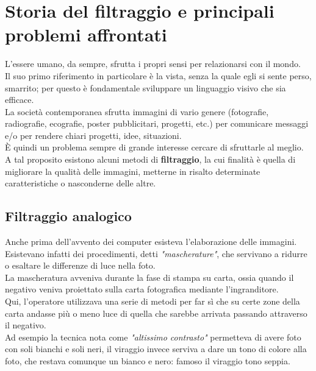 \section{Storia del filtraggio e principali problemi affrontati}

L'essere umano, da sempre, sfrutta i propri sensi per relazionarsi con il mondo.\\
Il suo primo riferimento in particolare è la vista, senza la quale egli si sente perso, smarrito; per questo è fondamentale sviluppare un linguaggio  visivo che sia efficace.\\
La società contemporanea sfrutta immagini di vario genere (fotografie, radiografie, ecografie, poster pubblicitari, progetti, etc.) per comunicare messaggi e/o per rendere chiari progetti, idee, situazioni.\\
\`E quindi un problema sempre di grande interesse cercare di sfruttarle al meglio. A tal proposito esistono alcuni metodi di \textbf{filtraggio}, la cui finalità è quella di migliorare la qualità delle immagini, metterne in risalto determinate caratteristiche o nasconderne delle altre.\\


\subsection{Filtraggio analogico}
Anche prima dell'avvento dei computer esisteva l'elaborazione delle immagini. Esistevano infatti dei procedimenti, detti \textit{"mascherature"}, che servivano a ridurre o esaltare le differenze di luce nella foto.\\
La mascheratura avveniva durante la fase di stampa su carta, ossia quando il negativo veniva proiettato sulla carta fotografica mediante l’ingranditore.\\

\noindent
Qui, %
l'operatore utilizzava una serie di metodi per far sì che su certe zone della carta andasse più o meno luce di quella che sarebbe arrivata passando attraverso il negativo.\\

\noindent
Ad esempio la tecnica nota come \textit{"altissimo contrasto"} permetteva di avere foto con soli bianchi e soli neri, il viraggio invece serviva a dare un tono di colore alla foto, che restava comunque un bianco e nero: famoso il viraggio tono seppia.\\
\newpage


